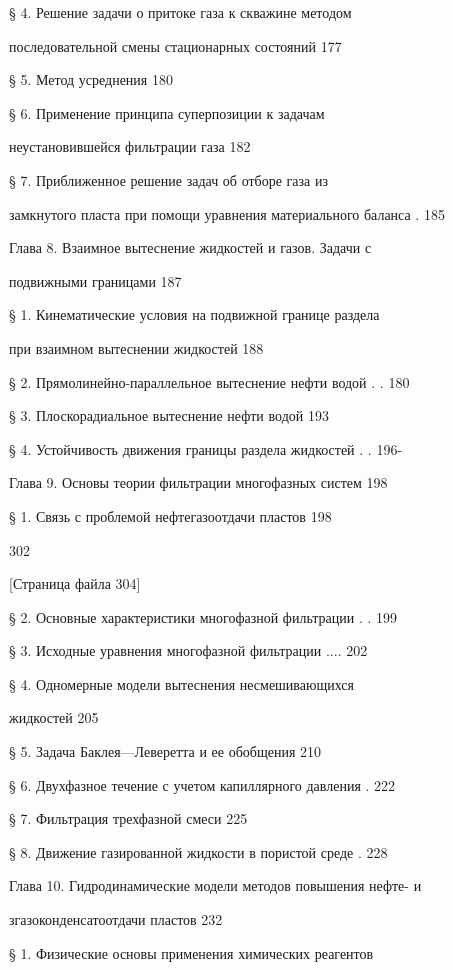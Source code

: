 \documentclass[
  11pt,
]{article}
\begin{document}
§ 4. Решение задачи о притоке газа к скважине методом  \par
последовательной смены стационарных состояний 177 \par
§ 5. Метод усреднения 180 \par
§ 6. Применение принципа суперпозиции к задачам  \par
неустановившейся фильтрации газа 182 \par
§ 7. Приближенное решение задач об отборе газа из  \par
замкнутого пласта при помощи уравнения материального баланса . 185 \par
Глава 8. Взаимное вытеснение жидкостей и газов. Задачи с  \par
подвижными границами 187 \par
§ 1. Кинематические условия на подвижной границе раздела \par
при взаимном вытеснении жидкостей 188 \par
§ 2. Прямолинейно-параллельное вытеснение нефти водой . . 180 \par
§ 3. Плоскорадиальное вытеснение нефти водой 193 \par
§ 4. Устойчивость движения границы раздела жидкостей . . 196- \par
Глава 9. Основы теории фильтрации многофазных систем 198 \par
§ 1. Связь с проблемой нефтегазоотдачи пластов 198 \par
302 \par
\smallskip
\smallskip
\smallskip
{[}Страница файла 304{]}\par
§ 2. Основные характеристики многофазной фильтрации . . 199 \par
§ 3. Исходные уравнения многофазной фильтрации .... 202 \par
§ 4. Одномерные модели вытеснения несмешивающихся  \par
жидкостей 205 \par
§ 5. Задача Баклея---Леверетта и ее обобщения 210 \par
§ 6. Двухфазное течение с учетом капиллярного давления . 222 \par
§ 7. Фильтрация трехфазной смеси 225 \par
§ 8. Движение газированной жидкости в пористой среде . 228 \par
Глава 10. Гидродинамические модели методов повышения нефте- и \par
згазоконденсатоотдачи пластов 232 \par
§ 1. Физические основы применения химических реагентов \par
\end{document}
